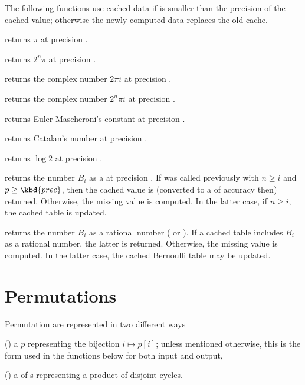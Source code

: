 The following functions use cached data if  is smaller than the
precision of the cached value; otherwise the newly computed data replaces the
old cache.

 returns $\pi$ at precision .

 returns $2^n\pi$ at precision .

 returns the complex number $2\pi i$ at
precision .

 returns the complex number $2^n\pi i$ at
precision .

 returns Euler-Mascheroni's constant at
precision .

 returns Catalan's number at precision .

 returns $\log 2$ at precision .

 returns the  number
$B_i$ as a  at precision . If  was called previously with $n \geq i$ and $p \geq \kbd{prec}$, then
the cached value is (converted to a  of accuracy  then)
returned. Otherwise, the missing value is computed. In the latter case,
if $n \geq i$, the cached table is updated.

 returns the  number $B_i$ as a
rational number ( or ). If a cached table includes $B_i$
as a rational number, the latter is returned. Otherwise, the missing value is
computed. In the latter case, the cached Bernoulli table may be updated.

\section{Permutations }

\noindent Permutation are represented in two different ways

\item () a  $p$ representing the bijection $i\mapsto
p[i]$; unless mentioned otherwise, this is the form used in the functions
below for both input and output,

\item () a  of s representing a product of
disjoint cycles.

